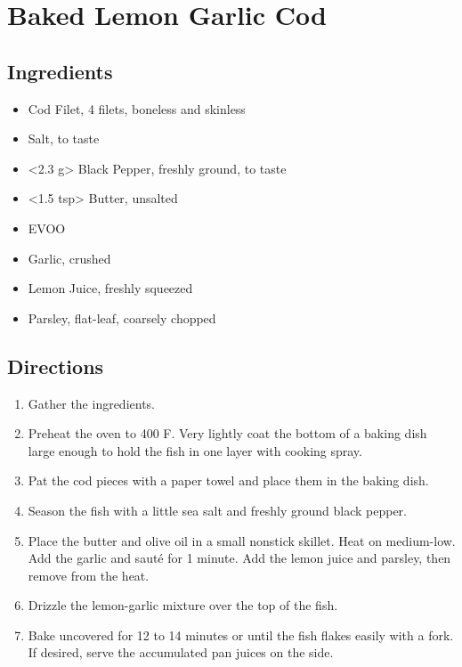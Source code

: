 \section{Baked Lemon Garlic Cod}

\subsection{ Ingredients }

\begin{itemize}
  \item <24 oz> Cod Filet, 4 filets, boneless and skinless 
  \item <1 tsp> Salt, to taste
  \item <2.3 g> Black Pepper, freshly ground, to taste 
  \item <1.5 tsp> Butter, unsalted
  \item <1 tbs> EVOO
  \item <2 cloves> Garlic, crushed 
  \item <2 tbs> Lemon Juice, freshly squeezed 
  \item <2 tbs> Parsley, flat-leaf, coarsely chopped
\end{itemize}

\subsection{ Directions }

\begin{enumerate}
  \item Gather the ingredients. 
  \item Preheat the oven to 400 F. Very lightly coat the bottom of a baking dish large enough to hold the fish in one layer with cooking spray. 
  \item Pat the cod pieces with a paper towel and place them in the baking dish. 
  \item Season the fish with a little sea salt and freshly ground black pepper.
  \item Place the butter and olive oil in a small nonstick skillet. Heat on medium-low. Add the garlic and sauté for 1 minute. Add the lemon juice and parsley, then remove from the heat. 
  \item Drizzle the lemon-garlic mixture over the top of the fish.
  \item Bake uncovered for 12 to 14 minutes or until the fish flakes easily with a fork. If desired, serve the accumulated pan juices on the side.
\end{enumerate}
